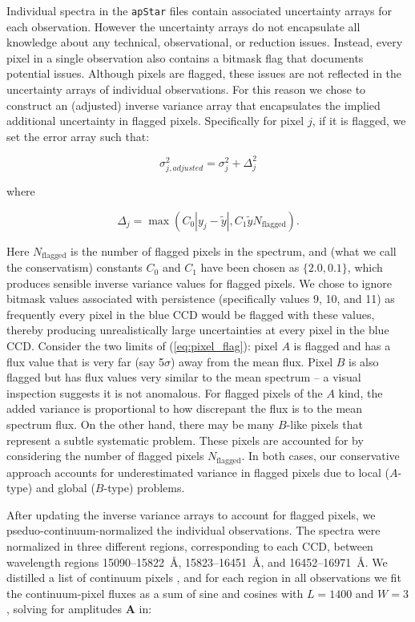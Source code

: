 \documentclass[12pt,preprint]{aastex6}
\newcommand{\Dvector}[1]{\boldsymbol{#1}}
\begin{document}
Individual spectra in the \texttt{apStar} files contain associated uncertainty arrays
for each observation.  However the uncertainty arrays do not encapsulate all knowledge
about any technical, observational, or reduction issues.  Instead, every pixel
in a single observation also contains a bitmask flag that documents potential
issues.  Although pixels are flagged, these issues are not reflected in the
uncertainty arrays of individual observations.  For this reason we chose to construct
an (adjusted) inverse variance array that encapsulates the implied additional 
uncertainty in flagged pixels.  Specifically for pixel $j$, if it is flagged, we set the error
array such that:

\begin{equation}
\sigma_{j,adjusted}^2 = \sigma_{j}^2 + \Delta_{j}^2
\end{equation}

\noindent{}where

\begin{equation}
\Delta_{j} = \max{\left(C_{0}|y_{j} - \widetilde{y}|,C_{1}\widetilde{y}N_\mathrm{flagged}\right)} .
\label{eq:pixel_flag}
\end{equation}

Here $N_\mathrm{flagged}$ is the number of flagged pixels in the spectrum, and (what
we call the conservatism) constants $C_0$ and $C_1$ have been chosen as 
$\{2.0,0.1\}$, which produces sensible inverse variance values for flagged
pixels.  We chose to ignore bitmask values associated with persistence 
(specifically values 9, 10, and 11) as frequently every pixel in the blue CCD
would be flagged with these values, thereby producing unrealistically large 
uncertainties at every pixel in the blue CCD.  Consider the two limits of (\ref{eq:pixel_flag}):
pixel $A$ is flagged and has a flux value that is very far (say 5$\sigma$) 
away from the mean flux. Pixel $B$ is also flagged but has flux values very
similar to the mean spectrum -- a visual inspection suggests it is not anomalous.
For flagged pixels of the $A$ kind, the added variance is proportional to how
discrepant the flux is to the mean spectrum flux. On the other hand, there may be many 
$B$-like pixels that represent a subtle systematic problem. These pixels are
accounted for by considering the number of flagged pixels $N_\mathrm{flagged}$. In both
cases, our conservative approach accounts for underestimated variance in flagged pixels 
due to local ($A$-type) and global ($B$-type) problems.


After updating the inverse variance arrays to account for flagged pixels, we
pseduo-continuum-normalized the individual observations. The spectra were 
normalized in three different regions, corresponding to each CCD, between
wavelength regions 15090--15822~\AA, 15823--16451~\AA, and 16452--16971~\AA.
We distilled a list of continuum pixels \citep[following the initial 
identification in][]{tc}, and for each region in all observations we fit
the continuum-pixel fluxes as a sum of sine and cosines with $L = 1400$ and 
$W = 3$, solving for amplitudes $\Dvector{A}$ in:
\end{document}
